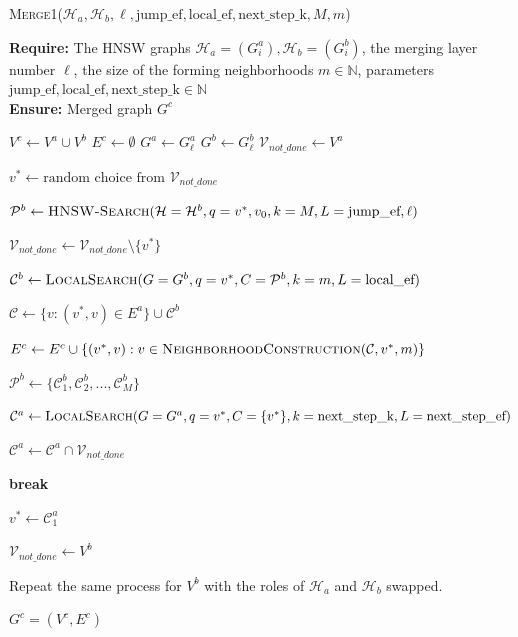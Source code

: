 \documentclass{article}
\begin{document}
\begin{algorithm}
\caption{\textsc{Merge1}($\mathcal{H}_a, \mathcal{H}_b, \ell, \text{jump\_ef}, \text{local\_ef}, \text{next\_step\_k}, M, m$)}\label{alg:merge1}
\textbf{Require:} The HNSW graphs $\mathcal{H}_a = (G^a_i), \mathcal{H}_b = (G^b_i)$, the merging layer number $\ell$, the size of the forming neighborhoods $m \in \mathbb{N}$, parameters $\text{jump\_ef}, \text{local\_ef}, \text{next\_step\_k} \in \mathbb{N}$ \\
\textbf{Ensure:}  Merged graph $G^c$ 
\begin{algorithmic}[1]
\State $V^c \gets V^a \cup V^b$
\State $E^c \gets \emptyset$
\State $G^a \gets G^a_{\ell} $
\State $G^b \gets G^b_{\ell} $
\State $\mathcal{V}_{not\_done} \gets V^a$

    \State $v^* \gets \text{random choice from } \mathcal{V}_{not\_done}$
    
    \State $\mathcal{P}^b  \gets \textsc{HNSW-Search}(\mathcal{H}=\mathcal{H}^b, q=v^*, v_0, k=M, L=\text{jump\_ef}, \ell)$
    
        \State $\mathcal{V}_{not\_done} \gets \mathcal{V}_{not\_done} \setminus \{v^*\}$
        
        \State $\mathcal{C}^b  \gets \textsc{LocalSearch}(G=G^b, q=v^*, C=\mathcal{P}^b , k=m, L=\text{local\_ef})$
        
        \State $\mathcal{C} \gets  \{v : (v^*, v) \in E^a \} \cup \mathcal{C}^b$
        
        \State $E^c \gets E^c \cup  \{ (v^*, v)  : v \in \textsc{NeighborhoodConstruction}(\mathcal{C}, v^*, m) \}$

        \State $\mathcal{P}^b \gets \{\mathcal{C}^b_1, \mathcal{C}^b_2, ..., \mathcal{C}^b_M \} $

        \State $\mathcal{C}^a  \gets \textsc{LocalSearch}(G=G^a, q=v^*, C=\{v^*\} , k=\text{next\_step\_k}, L=\text{next\_step\_ef})$
        
        \State $\mathcal{C}^a \gets \mathcal{C}^a \cap \mathcal{V}_{not\_done}$
        
            \State \textbf{break}
        \EndIf
        
        \State $v^* \gets \mathcal{C}^a_1$
    \EndWhile
\EndWhile

\State $\mathcal{V}_{not\_done} \gets V^b$

    \State Repeat the same process for $V^b$ with the roles of $\mathcal{H}_a$ and $\mathcal{H}_b$ swapped.
\EndWhile

\State \Return $G^c=(V^c,E^c)$

\end{algorithmic}
\end{algorithm}
\end{document}

